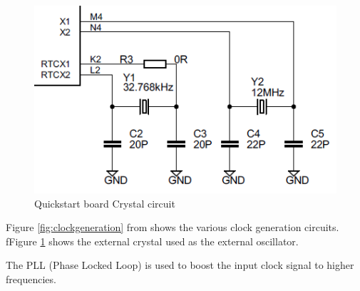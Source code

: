 \documentclass[a4paper]{tufte-handout}
\begin{document}
\begin{figure}
  \includegraphics[scale=0.75]{qsb-xtl}
  \caption{Quickstart board Crystal circuit}
  \label{fig:externalxtl}
\end{figure}

Figure \ref{fig:clockgeneration} from \citep[pg. 21]{lpc4088} shows
the various clock generation circuits.   fFigure
\ref{fig:externalxtl} \citep[sheet 2]{quickstart} shows the 
external crystal used as the external oscillator.

The PLL (Phase Locked Loop) is used to boost the input clock signal to
higher frequencies.
\end{document}
